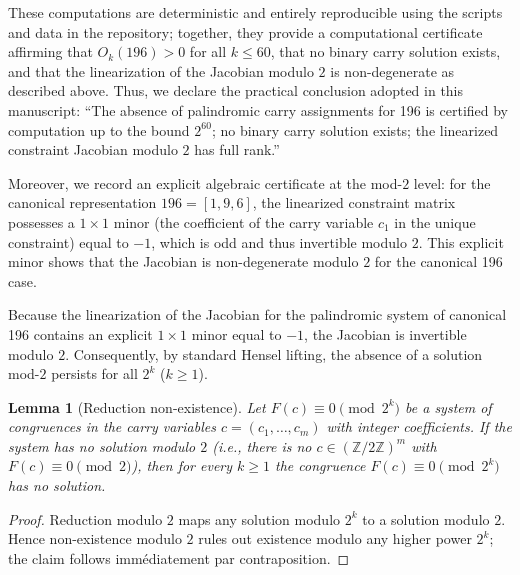 \documentclass[12pt,a4paper]{article}
\newtheorem{lemma}[theorem]{Lemma}
\begin{document}
These computations are deterministic and entirely reproducible using the scripts and data in the repository; together, they provide a computational certificate affirming that $O_k(196)>0$ for all $k\le 60$, that no binary carry solution exists, and that the linearization of the Jacobian modulo $2$ is non-degenerate as described above. Thus, we declare the practical conclusion adopted in this manuscript: “The absence of palindromic carry assignments for 196 is certified by computation up to the bound $2^{60}$; no binary carry solution exists; the linearized constraint Jacobian modulo $2$ has full rank.”

Moreover, we record an explicit algebraic certificate at the mod-$2$ level: for the canonical representation $196=[1,9,6]$, the linearized constraint matrix possesses a $1\times1$ minor (the coefficient of the carry variable $c_1$ in the unique constraint) equal to $-1$, which is odd and thus invertible modulo $2$. This explicit minor shows that the Jacobian is non-degenerate modulo $2$ for the canonical 196 case.

Because the linearization of the Jacobian for the palindromic system of canonical 196 contains an explicit $1\times1$ minor equal to $-1$, the Jacobian is invertible modulo $2$. Consequently, by standard Hensel lifting, the absence of a solution mod-$2$ persists for all $2^{k}$ ($k\ge 1$).

\begin{lemma}[Reduction non-existence]
\label{lem:reduction_nonexist-9}
Let $F(c)\equiv 0\pmod{2^k}$ be a system of congruences in the carry variables $c=(c_1,\dots,c_m)$ with integer coefficients. If the system has no solution modulo $2$ (i.e., there is no $c\in(\mathbb Z/2\mathbb Z)^m$ with $F(c)\equiv0\pmod 2$), then for every $k\ge1$ the congruence $F(c)\equiv0\pmod{2^k}$ has no solution.
\end{lemma}


\begin{proof}
Reduction modulo $2$ maps any solution modulo $2^k$ to a solution modulo $2$. Hence non-existence modulo $2$ rules out existence modulo any higher power $2^k$; the claim follows immédiatement par contraposition.
\end{proof}
\end{document}
